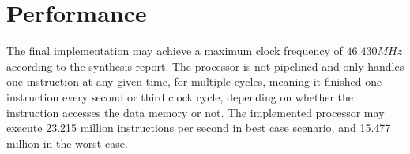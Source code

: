 \section{Performance}
The final implementation may achieve a maximum clock frequency of $46.430 MHz$ according to the synthesis report.
The processor is not pipelined and only handles one instruction at any given time,
for multiple cycles,
meaning it finished one instruction every second or third clock cycle,
depending on whether the instruction accesses the data memory or not.
The implemented processor may execute 23.215 million instructions per second in best case scenario, and 15.477 million in the worst case.

